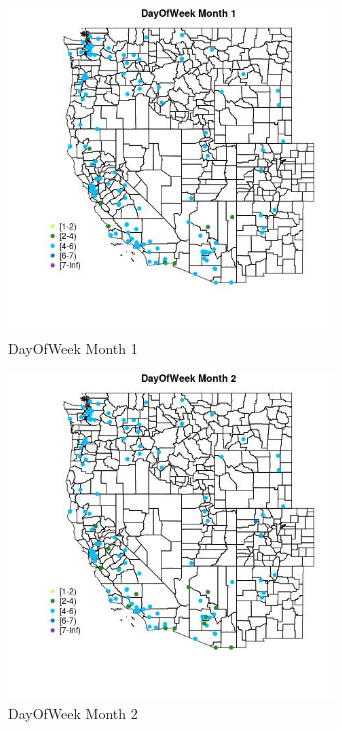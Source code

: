 \begin{figure} 
\centering  
\includegraphics[width=0.77\textwidth]{Code_Outputs/Report_ML_input_PM25_Step4_part_e_de_duplicated_aves_MapObsMo1DayOfWeek.jpg} 
\caption{\label{fig:Report_ML_input_PM25_Step4_part_e_de_duplicated_avesMapObsMo1DayOfWeek}DayOfWeek Month 1} 
\end{figure} 
 

\begin{figure} 
\centering  
\includegraphics[width=0.77\textwidth]{Code_Outputs/Report_ML_input_PM25_Step4_part_e_de_duplicated_aves_MapObsMo2DayOfWeek.jpg} 
\caption{\label{fig:Report_ML_input_PM25_Step4_part_e_de_duplicated_avesMapObsMo2DayOfWeek}DayOfWeek Month 2} 
\end{figure} 
 

